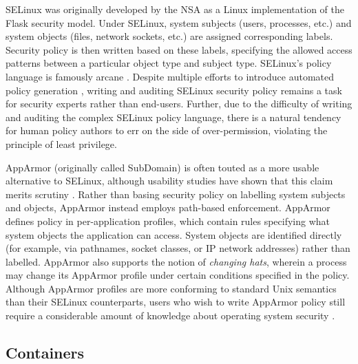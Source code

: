SELinux \cite{smalley2001_selinux} was originally developed by the NSA as a Linux implementation of the Flask \cite{spencer1999_flask} security model.  Under SELinux, system subjects (users, processes, etc.) and system objects (files, network sockets, etc.) are assigned corresponding labels. Security policy is then written based on these labels, specifying the allowed access patterns between a particular object type and subject type. SELinux's policy language is famously arcane \cite{schreuders12_towards}. Despite multiple efforts to introduce automated policy generation \cite{audit2allow, macmillan07_madison, sniffen06_guided}, writing and auditing SELinux security policy remains a task for security experts rather than end-users. Further, due to the difficulty of writing and auditing the complex SELinux policy language, there is a natural tendency for human policy authors to err on the side of over-permission, violating the principle of least privilege.

AppArmor (originally called SubDomain) \cite{cowan2000_apparmor} is often touted as a more usable alternative to SELinux, although usability studies have shown that this claim merits scrutiny \cite{schreuders12_towards}. Rather than basing security policy on labelling system subjects and objects, AppArmor instead employs path-based enforcement. AppArmor defines policy in per-application profiles, which contain rules specifying what system objects the application can access. System objects are identified directly (for example, via pathnames, socket classes, or IP network addresses) rather than labelled.  AppArmor also supports the notion of \textit{changing hats}, wherein a process may change its AppArmor profile under certain conditions specified in the policy.  Although AppArmor profiles are more conforming to standard Unix semantics than their SELinux counterparts, users who wish to write AppArmor policy still require a considerable amount of knowledge about operating system security \cite{schreuders12_towards}.

\subsection{Containers}
\label{subsection:containers}



